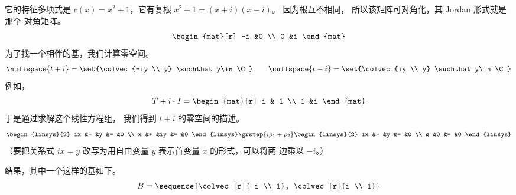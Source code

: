     \begin{answer}
       它的特征多项式是
       \( c(x)=x^2+1 \)，它有复根
       \( x^2+1=(x+i)(x-i) \)。
       因为根互不相同，
       所以该矩阵可对角化，其 Jordan 形式就是那个
       对角矩阵。 
       \begin{equation*}
         \begin{mat}[r]
           -i  &0  \\
            0  &i
         \end{mat}
       \end{equation*}  
       为了找一个相伴的基，我们计算零空间。
       \begin{equation*}
         \nullspace{t+i}=\set{\colvec{-iy \\ y}
                                        \suchthat y\in\C} 
         \qquad
         \nullspace{t-i}=\set{\colvec{iy \\ y}
                                        \suchthat y\in\C} 
       \end{equation*}
       例如，
       \begin{equation*}
         T+i\cdot I=
         \begin{mat}[r]
           i  &-1  \\
           1  &i
         \end{mat}
       \end{equation*}
       于是通过求解这个线性方程组，
       我们得到 $t+i$ 的零空间的描述。
       \begin{equation*}
         \begin{linsys}{2}
           ix  &-  &y  &=  &0  \\
            x  &+  &iy &=  &0
         \end{linsys}
         \grstep{i\rho_1+\rho_2}
         \begin{linsys}{2}
           ix  &-  &y  &=  &0  \\
               &   &0  &=  &0
         \end{linsys}
       \end{equation*}
       （要把关系式 $ix=y$ 改写为用自由变量 $y$ 表示首变量 $x$
       的形式，可以将两
       边乘以 $-i$。）

       结果，其中一个这样的基如下。
       \begin{equation*}
         B=\sequence{\colvec[r]{-i \\ 1},
                     \colvec[r]{i \\ 1}}
       \end{equation*}  
     \end{answer}
